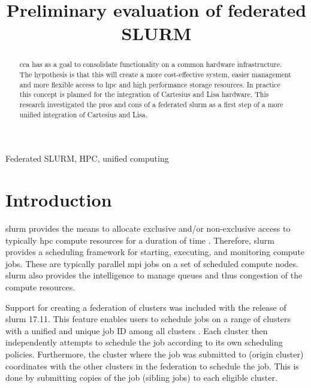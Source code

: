 \documentclass[conference]{IEEEtran}
\begin{document}
\title{Preliminary evaluation of federated SLURM}

\author{
}

\maketitle

\begin{abstract}
\gls{cca} has as a goal to consolidate functionality on a common hardware infrastructure. The hypothesis is that this will create a more cost-effective system, easier management and more flexible access to \gls{hpc} and high performance storage resources. In practice this concept is planned for the integration of Cartesius \cite{cartesius-userinfo} and Lisa \cite{lisa-userinfo} hardware. This research investigated the pros and cons of a federated \gls{slurm} as a first step of a more unified integration of Cartesius and Lisa.
\end{abstract}

\begin{IEEEkeywords}
Federated SLURM, HPC, unified computing
\end{IEEEkeywords}


\section{Introduction}
\label{sec-introduction}
\gls{slurm} provides the means to allocate exclusive and/or non-exclusive access to typically \gls{hpc} compute resources for a duration of time \cite{wiki-slurm}. Therefore, \gls{slurm} provides a scheduling framework for starting, executing, and monitoring compute jobs. These are typically parallel \gls{mpi} jobs on a set of scheduled compute nodes. \gls{slurm} also provides the intelligence to manage queues and thus congestion of the compute resources.

Support for creating a federation of clusters was included with the release of \gls{slurm} 17.11. This feature enables users to schedule jobs on a range of clusters with a unified and unique job ID among all clusters \cite{slurm-federated-guide}. Each cluster then independently attempts to schedule the job according to its own scheduling policies. Furthermore, the cluster where the job was submitted to (origin cluster) coordinates with the other clusters in the federation to schedule the job. This is done by submitting copies of the job (sibling jobs) to each eligible cluster.
\end{document}
